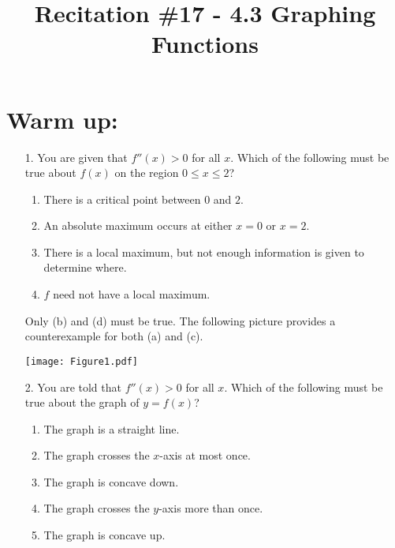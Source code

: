 \documentclass[handout,nooutcomes]{ximera}
\title{Recitation \#17 - 4.3 Graphing Functions}
\begin{document}
\begin{abstract}		\end{abstract}
\maketitle

\section*{Warm up:} 

	\begin{enumerate}
	
	\item[1.]  You are given that $f''(x) > 0$ for all $x$.  Which of the following must be true about $f(x)$ on the region $0 \leq x \leq 2$?
		\begin{enumerate}
		
		\item  There is a critical point between $0$ and $2$.  
		\item  An absolute maximum occurs at either $x=0$ or $x=2$.
		\item  There is a local maximum, but not enough information is given to determine where.
		\item  $f$ need not have a local maximum.
		
		\end{enumerate}

			\begin{freeResponse}
			Only (b) and (d) must be true.  The following picture provides a counterexample for both (a) and (c).
			
			\begin{image}
			\texttt{[image: Figure1.pdf]}
			\end{image}
						
			\end{freeResponse}	
		
		
		
	\item[2.]  You are told that $f''(x) > 0$ for all $x$.  Which of the following must be true about the graph of $y=f(x)$?
		\begin{enumerate}
		
		\item  The graph is a straight line.  
		\item  The graph crosses the $x$-axis at most once.
		\item  The graph is concave down.
		\item  The graph crosses the $y$-axis more than once.
		\item  The graph is concave up.
		

\end{enumerate}
\end{enumerate}
\end{document}
